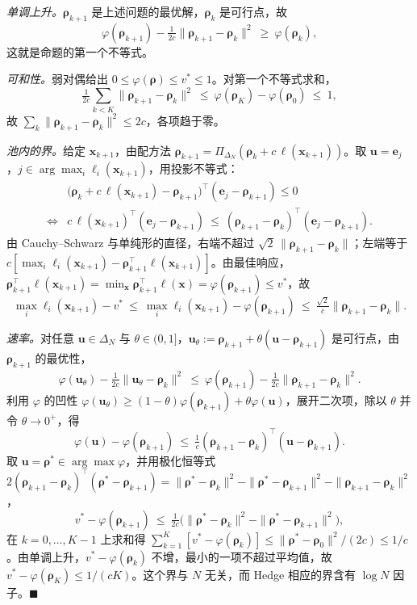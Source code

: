 \documentclass{article}
\theoremstyle{plain}
\theoremstyle{remark}
\newcommand{\Proj}{\Pi}
\newcommand{\simplex}{\Delta}
\newcommand{\bx}{{\bm{x}}}
\newcommand{\bu}{{\bm{u}}}
\newcommand{\be}{{\bm{e}}}
\newcommand{\brho}{{\bm{\rho}}}
\newcommand{\bell}{{\bm{\ell}}}
\begin{document}
\textit{单调上升。}$\brho_{k+1}$ 是上述问题的最优解，$\brho_k$ 是可行点，故
\[
\varphi(\brho_{k+1})-\tfrac1{2c}\|\brho_{k+1}-\brho_k\|^2\ \ge\ \varphi(\brho_k) ,
\]
这就是命题的第一个不等式。

\textit{可和性。}弱对偶给出 $0\le\varphi(\brho)\le v^*\le1$。对第一个不等式求和，
\[
\tfrac1{2c}\sum_{k<K}\|\brho_{k+1}-\brho_k\|^2\ \le\ \varphi(\brho_K)-\varphi(\brho_0)\ \le\ 1 ,
\]
故 $\sum_k\|\brho_{k+1}-\brho_k\|^2\le2c$，各项趋于零。

\textit{池内的界。}给定 $\bx_{k+1}$，由配方法 $\brho_{k+1}=\Proj_{\simplex_N}(\brho_k+c\,\bell(\bx_{k+1}))$。取 $\bu=\be_j$，$j\in\arg\max_i\ell_i(\bx_{k+1})$，用投影不等式：
\begin{align*}
&\big(\brho_k+c\,\bell(\bx_{k+1})-\brho_{k+1}\big)^\top(\be_j-\brho_{k+1})\le0\\
\iff{}&
c\,\bell(\bx_{k+1})^\top(\be_j-\brho_{k+1})\ \le\ (\brho_{k+1}-\brho_k)^\top(\be_j-\brho_{k+1}) .
\end{align*}
由 Cauchy--Schwarz 与单纯形的直径，右端不超过 $\sqrt2\,\|\brho_{k+1}-\brho_k\|$；左端等于 $c[\max_i\ell_i(\bx_{k+1})-\brho_{k+1}^\top\bell(\bx_{k+1})]$。由最佳响应，$\brho_{k+1}^\top\bell(\bx_{k+1})=\min_\bx\brho_{k+1}^\top\bell(\bx)=\varphi(\brho_{k+1})\le v^*$，故
\[
\max_i\ell_i(\bx_{k+1})-v^*\ \le\ \max_i\ell_i(\bx_{k+1})-\varphi(\brho_{k+1})\ \le\ \tfrac{\sqrt2}{c}\|\brho_{k+1}-\brho_k\| .
\]

\textit{速率。}对任意 $\bu\in\simplex_N$ 与 $\theta\in(0,1]$，$\bu_\theta:=\brho_{k+1}+\theta(\bu-\brho_{k+1})$ 是可行点，由 $\brho_{k+1}$ 的最优性，
\[
\varphi(\bu_\theta)-\tfrac1{2c}\|\bu_\theta-\brho_k\|^2\ \le\ \varphi(\brho_{k+1})-\tfrac1{2c}\|\brho_{k+1}-\brho_k\|^2 .
\]
利用 $\varphi$ 的凹性 $\varphi(\bu_\theta)\ge(1-\theta)\varphi(\brho_{k+1})+\theta\varphi(\bu)$，展开二次项，除以 $\theta$ 并令 $\theta\to0^+$，得
\[
\varphi(\bu)-\varphi(\brho_{k+1})\ \le\ \tfrac1c(\brho_{k+1}-\brho_k)^\top(\bu-\brho_{k+1}) .
\]
取 $\bu=\brho^*\in\arg\max\varphi$，并用极化恒等式 $2(\brho_{k+1}-\brho_k)^\top(\brho^*-\brho_{k+1})=\|\brho^*-\brho_k\|^2-\|\brho^*-\brho_{k+1}\|^2-\|\brho_{k+1}-\brho_k\|^2$，
\[
v^*-\varphi(\brho_{k+1})\ \le\ \tfrac1{2c}\big(\|\brho^*-\brho_k\|^2-\|\brho^*-\brho_{k+1}\|^2\big),
\]
在 $k=0,\dots,K-1$ 上求和得 $\sum_{k=1}^K[v^*-\varphi(\brho_k)]\le\|\brho^*-\brho_0\|^2/(2c)\le1/c$。由单调上升，$v^*-\varphi(\brho_k)$ 不增，最小的一项不超过平均值，故 $v^*-\varphi(\brho_K)\le1/(cK)$。这个界与 $N$ 无关，而 Hedge 相应的界含有 $\log N$ 因子。\hfill$\blacksquare$

\end{document}
